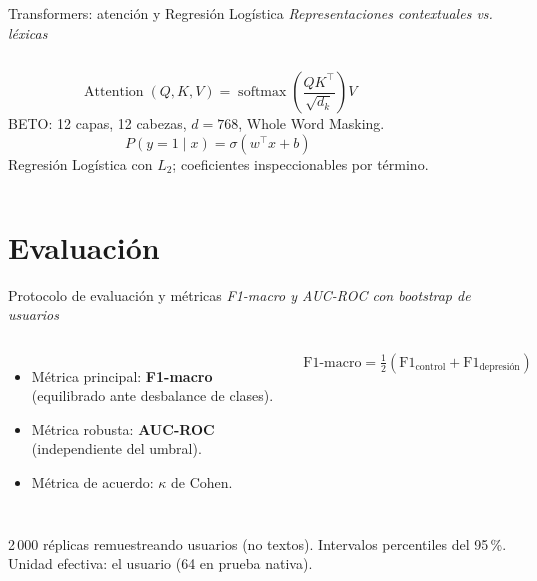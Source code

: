 ﻿\documentclass[11pt,aspectratio=169]{beamer}
\newcommand{\ugrsubtitle}[1]{%
  \vskip-0.25cm
  \small\textcolor{ugrGris}{\emph{#1}}\par
  \vskip0.15cm
}
\newcommand{\ugrblock}[2]{
  \begin{tcolorbox}[
    enhanced, colback=ugrFondoClaro, colframe=ugrAzul, boxrule=0.8pt, arc=3pt,
    title={\textbf{#1}}, fonttitle=\small\bfseries, coltitle=white, colbacktitle=ugrAzul,
    left=6pt, right=6pt, top=2pt, bottom=2pt, before skip=0.3em, after skip=0.2em
  ]
    #2
  \end{tcolorbox}
}
\begin{document}
\begin{frame}{Transformers: atención y Regresión Logística}
  \ugrsubtitle{Representaciones contextuales vs. léxicas}
  \begin{columns}[t]
    \begin{equation}
      \operatorname{Attention}(Q,K,V) =
      \operatorname{softmax}\!\left(\frac{QK^{\top}}{\sqrt{d_k}}\right)V
    \end{equation}
    BETO: 12 capas, 12 cabezas, $d=768$, Whole Word Masking.
    \begin{equation}
      P(y=1\mid x) = \sigma(w^{\top}x + b)
    \end{equation}
    Regresión Logística con $L_2$; coeficientes inspeccionables por término.
  \end{columns}
\end{frame}

\section{Evaluación}
\begin{frame}{Protocolo de evaluación y métricas}
  \ugrsubtitle{F1-macro y AUC-ROC con bootstrap de usuarios}
  \begin{columns}[t]
    \begin{itemize}
      \item Métrica principal: \textbf{F1-macro} (equilibrado ante desbalance de clases).
      \item Métrica robusta: \textbf{AUC-ROC} (independiente del umbral).
      \item Métrica de acuerdo: $\kappa$ de Cohen.
    \end{itemize}
    \begin{equation}
      \text{F1-macro} = \tfrac{1}{2}\left(\text{F1}_{\text{control}} + \text{F1}_{\text{depresión}}\right)
    \end{equation}
  \end{columns}
  \ugrblock{Incertidumbre: bootstrap por conglomerados de usuarios}{
    2\,000 réplicas remuestreando usuarios (no textos). Intervalos percentiles del 95\,\%. Unidad efectiva: el usuario (64 en prueba nativa).
  }
\end{frame}
\end{document}
